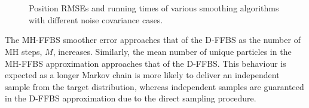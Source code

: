 \documentclass[peerreview,11pt,draftcls,onecolumn]{IEEEtran}
\begin{document}
\begin{figure}[!t]
\centering
{}
\\
\\
\caption{Position RMSEs and running times of various smoothing algorithms with different noise covariance cases.}%
\label{fig:rmse_vs_time}%
\end{figure}

The MH-FFBS smoother error approaches that of the D-FFBS as the number of MH steps, $M$, increases. Similarly, the mean number of unique particles in the MH-FFBS approximation approaches that of the D-FFBS. This behaviour is expected as a longer Markov chain is more likely to deliver an independent sample from the target distribution, whereas independent samples are guaranteed in the D-FFBS approximation due to the direct sampling procedure.
\end{document}
